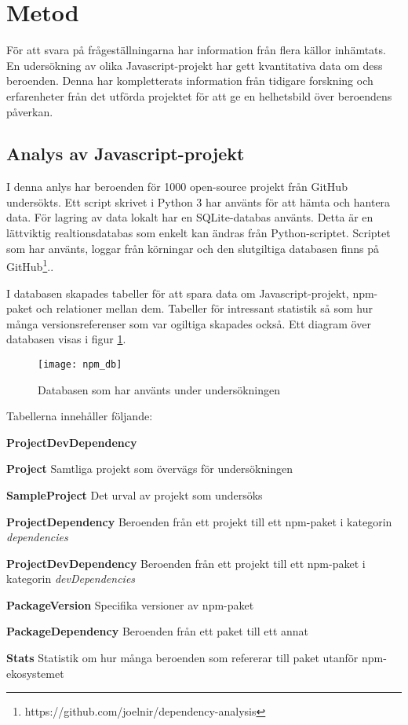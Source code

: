 \section{Metod}
\label{sec:joel_o-method}
För att svara på frågeställningarna har information från flera källor inhämtats. En udersökning av olika Javascript-projekt har gett kvantitativa data om dess beroenden. Denna har kompletterats information från tidigare forskning och erfarenheter från det utförda projektet för att ge en helhetsbild över beroendens påverkan.

\subsection{Analys av Javascript-projekt}
\label{subsec:joel_o-method-analys}
I denna anlys har beroenden för 1000 open-source projekt från GitHub undersökts. Ett script skrivet i Python 3 har använts för att hämta och hantera data. För lagring av data lokalt har en SQLite-databas använts. Detta är en lättviktig realtionsdatabas som enkelt kan ändras från Python-scriptet. Scriptet som har använts, loggar från körningar och den slutgiltiga databasen finns på GitHub\footnote{https://github.com/joelnir/dependency-analysis}..

I databasen skapades tabeller för att spara data om Javascript-projekt, npm-paket och relationer mellan dem. Tabeller för intressant statistik så som hur många versionsreferenser som var ogiltiga skapades också. Ett diagram över databasen visas i figur \ref{fig:dependency-db}.

\begin{figure}[h]
  \centering
  \texttt{[image: npm\_db]}
  \caption{Databasen som har använts under undersökningen}
  \label{fig:dependency-db}
\end{figure}

Tabellerna innehåller följande:

\begin{labeling}{\textbf{ProjectDevDependency}}
  \item [\textbf{Project}] Samtliga projekt som övervägs för undersökningen
  \item [\textbf{SampleProject}] Det urval av projekt som undersöks
  \item [\textbf{ProjectDependency}] Beroenden från ett projekt till ett npm-paket i kategorin \textit{dependencies}
  \item [\textbf{ProjectDevDependency}] Beroenden från ett projekt till ett npm-paket i kategorin \textit{devDependencies}
  \item [\textbf{PackageVersion}] Specifika versioner av npm-paket
  \item [\textbf{PackageDependency}] Beroenden från ett paket till ett annat
  \item [\textbf{Stats}] Statistik om hur många beroenden som refererar till paket utanför npm-ekosystemet
\end{labeling}

